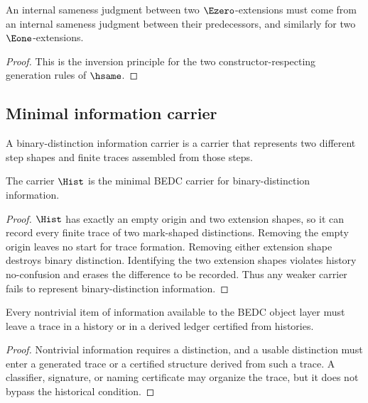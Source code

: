 \begin{corollary}
\label{cor:philosophy-history-identity-constructor-shape}
An internal sameness judgment between two \(\Ezero\)-extensions must
come from an internal sameness judgment between their predecessors, and
similarly for two \(\Eone\)-extensions.
\end{corollary}
\begin{proof}
This is the inversion principle for the two constructor-respecting
generation rules of \(\hsame\).
\end{proof}

\subsection{Minimal information carrier}
\label{subsec:minimal-information-carrier}

\begin{definition}
\label{def:philosophy-binary-distinction-information-carrier}
A binary-distinction information carrier is a carrier that represents
two different step shapes and finite traces assembled from those steps.
\end{definition}

\begin{theorem}
\label{thm:philosophy-hist-minimal-binary-distinction-carrier}
The carrier \(\Hist\) is the minimal BEDC carrier for binary-distinction
information.
\end{theorem}
\begin{proof}
\(\Hist\) has exactly an empty origin and two extension shapes, so it
can record every finite trace of two mark-shaped distinctions. Removing
the empty origin leaves no start for trace formation. Removing either
extension shape destroys binary distinction. Identifying the two
extension shapes violates history no-confusion and erases the
difference to be recorded. Thus any weaker carrier fails to represent
binary-distinction information.
\end{proof}

\begin{corollary}
\label{cor:philosophy-information-requires-history}
Every nontrivial item of information available to the BEDC object layer
must leave a trace in a history or in a derived ledger certified from
histories.
\end{corollary}
\begin{proof}
Nontrivial information requires a distinction, and a usable distinction
must enter a generated trace or a certified structure derived from such
a trace. A classifier, signature, or naming certificate may organize
the trace, but it does not bypass the historical condition.
\end{proof}


